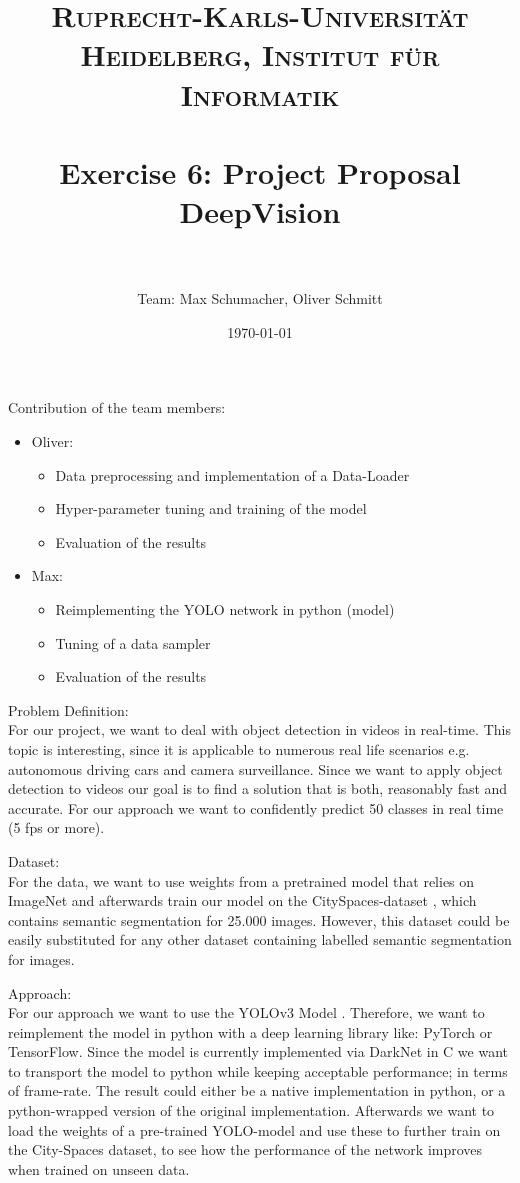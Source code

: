\documentclass[paper=a4, fontsize=13pt]{scrartcl} %
\title{	
\normalfont \normalsize 
\textsc{Ruprecht-Karls-Universität Heidelberg, Institut für Informatik} \\ [25pt] %
\horrule{0.5pt} \\[0.4cm] %
\huge Exercise 6: Project Proposal \\ DeepVision\\ %
\horrule{2pt} \\[0.5cm] %
}
\author{Team: Max Schumacher, Oliver Schmitt} %
\date{\normalsize\today} %
\numberwithin{equation}{section} %
\numberwithin{figure}{section} %
\numberwithin{table}{section} %
\begin{document}
\maketitle

\begin{description}
\item{Contribution of the team members:} \\
\begin{itemize}
\item Oliver:
\begin{itemize}
\item Data preprocessing and implementation of a Data-Loader
\item Hyper-parameter tuning and training of the model
\item Evaluation of the results
\end{itemize}
\item Max:
\begin{itemize}
\item Reimplementing the YOLO network in python (model)
\item Tuning of a data sampler
\item Evaluation of the results
\end{itemize}
\end{itemize}
\item{Problem Definition:} \\
For our project, we want to deal with object detection in videos in real-time. This topic is interesting, since it is applicable to numerous real life scenarios e.g. autonomous driving cars and camera surveillance.
Since we want to apply object detection to videos our goal is to find a solution that is both, reasonably fast and accurate. For our approach we want to confidently predict 50 classes in real time (5 fps or more).
\item{Dataset:} \\
For the data, we want to use weights from a pretrained model that relies on ImageNet \cite{ImageNet} and afterwards train our model on the CitySpaces-dataset \cite{CitySpaces}, which contains semantic segmentation for 25.000 images. However, this dataset could be easily substituted for any other dataset containing labelled semantic segmentation for images.
\item{Approach:} \\
For our approach we want to use the YOLOv3 Model \cite{YOLO}. Therefore, we want to reimplement the model in python with a deep learning library like: PyTorch or TensorFlow. Since the model is currently implemented via DarkNet \cite{DarkNet} in C we want to transport the model to python while keeping acceptable performance; in terms of frame-rate. The result could either be a native implementation in python, or a python-wrapped version of the original implementation. Afterwards we want to load the weights of a pre-trained YOLO-model and use these to further train on the City-Spaces dataset, to see how the performance of the network improves when trained on unseen data. 

\end{description}
\end{document}
